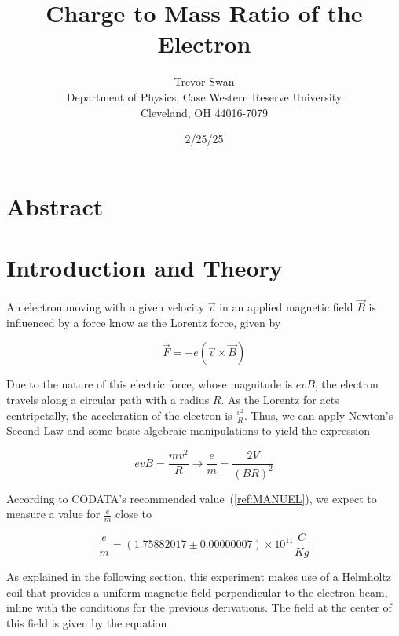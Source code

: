\documentclass[12pt]{article}
\title{Charge to Mass Ratio of the Electron}
\author{Trevor Swan \\
Department of Physics, Case Western Reserve University \\
Cleveland, OH 44016-7079}
\date{2/25/25}
\newcommand{\paren}[1]{\left( {#1} \right)}
\begin{document}
\pagestyle{fancy}
\fancyhf{}

\maketitle
\thispagestyle{fancy}
\renewcommand{\headrulewidth}{0pt}

\fancyfoot[C]{\thepage}

\section{Abstract}
\lipsum[1]

\section{Introduction and Theory}
An electron moving with a given velocity $\vec{v}$ in an applied magnetic field $\vec{B}$ is influenced by a force know as the Lorentz force, given by

\begin{equation}
	\vec{F} = -e\paren{\vec{v}\times\vec{B}} \label{e:Lorentz}
\end{equation}

Due to the nature of this electric force, whose magnitude is $evB$, the electron travels along a circular path with a radius $R$. As the Lorentz for acts centripetally, the acceleration of the electron is $\frac{v^2}{R}$. Thus, we can apply Newton's Second Law and some basic algebraic manipulations to yield the expression

\begin{equation}
	evB=\frac{mv^2}{R}\rightarrow \frac{e}{m}=\frac{2V}{(BR)^2}
	\label{e:N2L_e_over_m}
\end{equation}

According to CODATA's recommended value~(\ref{ref:MANUEL}), we expect to measure a value for $\frac{e}{m}$ close to

\begin{equation*}
	\frac{e}{m}=(1.75882017\pm0.00000007)\times10^{11} \frac{C}{Kg}
\end{equation*} 

As explained in the following section, this experiment makes use of a Helmholtz coil that provides a uniform magnetic field perpendicular to the electron beam, inline with the conditions for the previous derivations. The field at the center of this field is given by the equation
\end{document}
